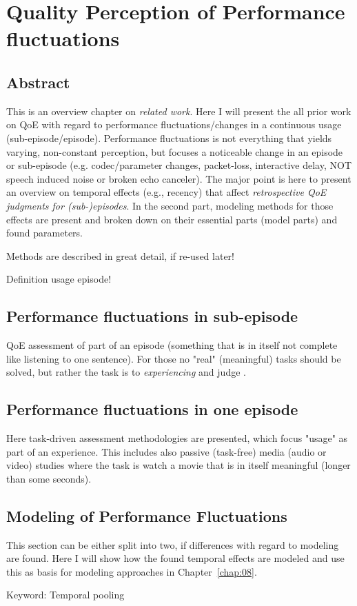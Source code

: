 \chapter{Quality Perception of Performance fluctuations}\label{chap:04}
\section*{Abstract}
This is an overview chapter on \textit{related work}.
Here I will present the all prior work on QoE with regard to performance fluctuations/changes in a continuous usage (sub-episode/episode).
Performance fluctuations is not everything that yields varying, non-constant perception, but focuses a noticeable change in an episode or sub-episode (e.g. codec/parameter changes, packet-loss, interactive delay, NOT speech induced noise or broken echo canceler).
The major point is here to present an overview on temporal effects (e.g., recency) that affect \textit{retrospective QoE judgments for (sub-)episodes}.
In the second part, modeling methods for those effects are present and broken down on their essential parts (model parts) and found parameters.

Methods are described in great detail, if re-used later!


Definition usage episode!

\section{Performance fluctuations in sub-episode}
QoE assessment of part of an episode (something that is in itself not complete like listening to one sentence).
For those no "real" (meaningful) tasks should be solved, but rather the task is to \textit{experiencing} and judge \cite{egger_qoe_2014}.

\section{Performance fluctuations in one episode}
Here task-driven assessment methodologies are presented, which focus "usage" as part of an experience.
This includes also passive (task-free) media (audio or video) studies where the task is watch a movie that is in itself meaningful (longer than some seconds).

\section{Modeling of Performance Fluctuations}
This section can be either split into two, if differences with regard to modeling are found.
Here I will show how the found temporal effects are modeled and use this as basis for modeling approaches in Chapter~\ref{chap:08}.

Keyword: Temporal pooling
